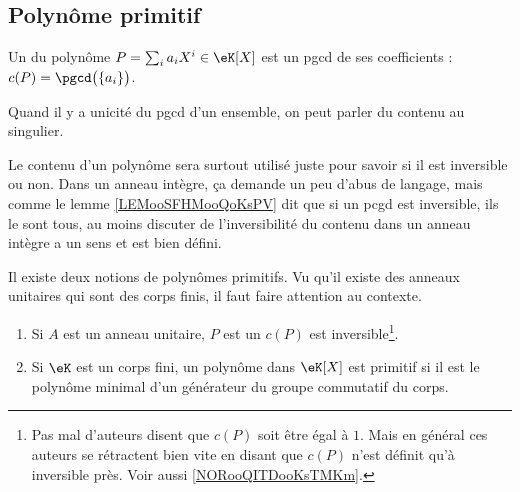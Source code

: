 \subsection{Polynôme primitif}

\begin{definition}\label{DefContenuPolynome}
	Un  du polynôme \( P=\sum_ia_iX^i\in\eK[X]\) est un pgcd de ses coefficients : \( c(P)=\pgcd\big(\{ a_i \}\big)\).
\end{definition}

\begin{normaltext}		\label{NORooQITDooKsTMKm}
	Quand il y a unicité du pgcd d'un ensemble, on peut parler du contenu au singulier.

	Le contenu d'un polynôme sera surtout utilisé juste pour savoir si il est inversible ou non. Dans un anneau intègre, ça demande un peu d'abus de langage, mais comme le lemme \ref{LEMooSFHMooQoKsPV} dit que si un pcgd est inversible, ils le sont tous, au moins discuter de l'inversibilité du contenu dans un anneau intègre a un sens et est bien défini.
\end{normaltext}

\begin{definition}           \label{DEFooDVOOooKaPZQC}
	Il existe deux notions de polynômes primitifs. Vu qu'il existe des anneaux unitaires qui sont des corps finis, il faut faire attention au contexte.
	\begin{enumerate}
		\item		\label{ITEMooCNHAooVfIYEW}
		      Si \( A\) est un anneau unitaire, \( P\) est un  \( c(P) \) est inversible\footnote{Pas mal d'auteurs disent que \( c(P)\) soit être égal à \( 1\). Mais en général ces auteurs se rétractent bien vite en disant que \( c(P)\) n'est définit qu'à inversible près. Voir aussi \ref{NORooQITDooKsTMKm}.}.
		\item
		      Si \( \eK\) est un corps fini, un polynôme dans \( \eK[X]\) est primitif si il est le polynôme minimal d'un générateur du groupe commutatif du corps.
	\end{enumerate}
\end{definition}


